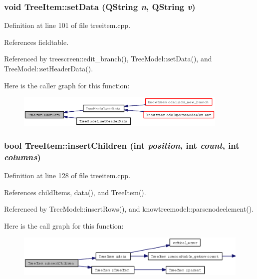 \subsubsection{\setlength{\rightskip}{0pt plus 5cm}void Tree\-Item::set\-Data (QString {\em n}, QString {\em v})}\label{classTreeItem_4e613f935d91a595e2b61e06726bc364}




Definition at line 101 of file treeitem.cpp.

References fieldtable.

Referenced by treescreen::edit\_\-branch(), Tree\-Model::set\-Data(), and Tree\-Model::set\-Header\-Data().

Here is the caller graph for this function:\begin{figure}[H]
\begin{center}
\leavevmode
\includegraphics[width=287pt]{classTreeItem_4e613f935d91a595e2b61e06726bc364_icgraph}
\end{center}
\end{figure}
\subsubsection{\setlength{\rightskip}{0pt plus 5cm}bool Tree\-Item::insert\-Children (int {\em position}, int {\em count}, int {\em columns})}\label{classTreeItem_d6b6da67cc03e79c714419f93f5005c6}




Definition at line 128 of file treeitem.cpp.

References child\-Items, data(), and Tree\-Item().

Referenced by Tree\-Model::insert\-Rows(), and knowtreemodel::parsenodeelement().

Here is the call graph for this function:\begin{figure}[H]
\begin{center}
\leavevmode
\includegraphics[width=362pt]{classTreeItem_d6b6da67cc03e79c714419f93f5005c6_cgraph}
\end{center}
\end{figure}


